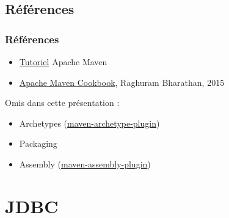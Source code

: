 \documentclass[english, french]{beamer}
\begin{document}
\subsection{Références}
\begin{frame}
	\frametitle{Références}
	\begin{itemize}
		\item \href{https://maven.apache.org/guides/getting-started/index.html}{Tutoriel} Apache Maven
		\item \href{http://gen.lib.rus.ec/book/index.php?md5=6e0bc8159b52299fdb912e3726c43bd9}{Apache Maven Cookbook}, Raghuram Bharathan, 2015
	\end{itemize}
	Omis dans cette présentation :
	\begin{itemize}
		\item Archetypes (\href{http://maven.apache.org/archetype/maven-archetype-plugin/usage.html}{maven-archetype-plugin})
		\item Packaging
		\item Assembly (\href{http://maven.apache.org/plugins/maven-assembly-plugin/}{maven-assembly-plugin})
	\end{itemize}
\end{frame}

\section{JDBC}
\end{document}
